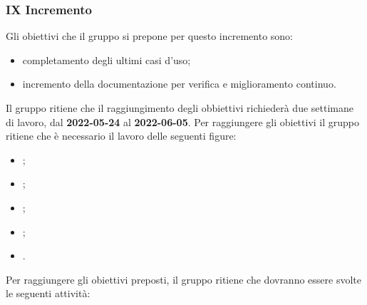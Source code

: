 \subsubsection{IX Incremento}
Gli obiettivi che il gruppo si prepone per questo incremento sono:
\begin{itemize}
	\item completamento degli ultimi casi d'uso;
  	\item incremento della documentazione per verifica e miglioramento continuo.
\end{itemize}
Il gruppo ritiene che il raggiungimento degli obbiettivi richiederà due settimane di lavoro, dal \textbf{2022-05-24} al \textbf{2022-06-05}.
Per raggiungere gli obiettivi il gruppo ritiene che è necessario il lavoro delle seguenti figure:
\begin{itemize}
	\item \RE{};
 	\item \AM{};
   	\item \PT{};
    \item \PR{};
   	\item \VE{}.
\end{itemize}
Per raggiungere gli obiettivi preposti, il gruppo ritiene che dovranno essere svolte le seguenti attività:
